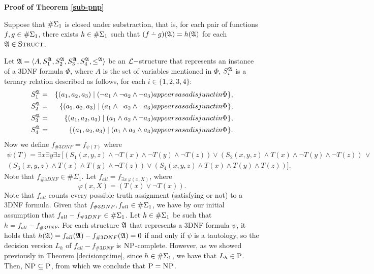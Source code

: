 \textbf{Proof of Theorem \ref{sub-pnp}}

Suppose that $\#\Sigma_{1}$ is closed under substraction, that is, for each pair of functions $f,g\in \#\Sigma_{1}$, there exists $h\in\#\Sigma_{1}$ such that $(f\dotminus g)(\A) = h(\A)$ for each $\mathfrak{A}\in\text{\sc Struct}$.

Let $\mathfrak{A} = \langle A, S_1^{\mathfrak{A}}, S_2^{\mathfrak{A}}, S_3^{\mathfrak{A}}, S_4^{\mathfrak{A}}, \leq^{\mathfrak{A}} \rangle$ be an $\L-$structure that represents an instance of a 3DNF formula $\Phi$, where $A$ is the set of variables mentioned in $\Phi$, $S_i^{\mathfrak{A}}$ is a ternary relation described as follows, for each $i\in\{1,2,3,4\}$:
\begin{eqnarray*}
	S_1^{\mathfrak{A}} &=& \{(a_1,a_2,a_3)\mid (\neg a_1 \wedge \neg a_2 \wedge \neg a_3) \relax{ appears as a disjunct in }\Phi\},\\
	S_2^{\mathfrak{A}} &=& \{(a_1,a_2,a_3)\mid ( a_1 \wedge \neg a_2 \wedge \neg a_3) \relax{ appears as a disjunct in }\Phi\},\\
	S_3^{\mathfrak{A}} &=& \{(a_1,a_2,a_3)\mid ( a_1 \wedge  a_2 \wedge \neg a_3) \relax{ appears as a disjunct in }\Phi\},\\
	S_4^{\mathfrak{A}} &=& \{(a_1,a_2,a_3)\mid ( a_1 \wedge  a_2 \wedge  a_3) \relax{ appears as a disjunct in }\Phi\}.
\end{eqnarray*}
Now we define $f_{\#3DNF} = f_{\psi(T)}$ where
\begin{multline*}
\psi(T) = \exists x \exists y \exists z\, [(S_1(x,y,z) \wedge \neg T(x) \wedge \neg T(y) \wedge \neg T(z)) \vee (S_2(x,y,z) \wedge T(x) \wedge \neg T(y) \wedge \neg T(z)) \, \vee \\ (S_3(x,y,z) \wedge T(x) \wedge T(y) \wedge \neg T(z)) \vee (S_4(x,y,z) \wedge T(x) \wedge T(y) \wedge T(z))].
\end{multline*}
Note that $f_{\#3DNF} \in \#\Sigma_1$. Let $f_{all} = f_{\exists x\:\varphi(x,X)}$, where
$$
\varphi(x,X) = (T(x) \vee \neg T(x)).
$$
Note that $f_{all}$ counts every possible truth assignment (satisfying or not) to a 3DNF formula. Given that $f_{\#3DNF}, f_{all} \in \#\Sigma_{1}$, we have by our initial assumption that $f_{all}-f_{\#3DNF} \in \#\Sigma_{1}$. Let $h\in\#\Sigma_{1}$ be such that $h = f_{all}-f_{\#3DNF}$. For each structure $\mathfrak{A}$ that represents a 3DNF formula $\psi$, it holds that $h(\mathfrak{A}) = f_{all}(\mathfrak{A})-f_{\#3DNF}(\mathfrak{A}) = 0$ if and only if $\psi$ is a tautology, so the decision version $L_h$ of $f_{all}-f_{\#3DNF}$ is $\text{\sc NP}$-complete. However, as we showed previously in Theorem \ref{decisionptime}, since $h\in\#\Sigma_{1}$, we have that $L_h \in \text{\sc P}$. Then, $\text{\sc NP} \subseteq \text{\sc P}$, from which we conclude that $\text{\sc P} = \text{\sc NP}$.
	
